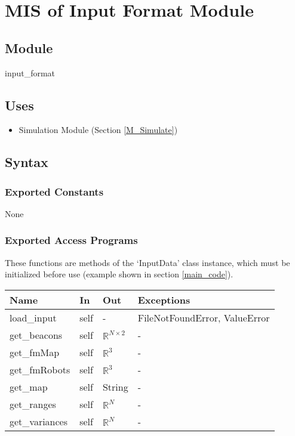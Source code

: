 \documentclass[12pt, titlepage]{article}
\begin{document}

\newpage

\section{MIS of Input Format Module} \label{M_Input} 



\subsection{Module}

input\_format

\subsection{Uses}
\begin{itemize}
  \item Simulation Module (Section \ref{M_Simulate})
\end{itemize}

\subsection{Syntax}

\subsubsection{Exported Constants}
None
\subsubsection{Exported Access Programs}

These functions are methods of the `InputData' class instance, which must be initialized before use (example shown in section \ref{main_code}).

\begin{center}
\begin{tabular}{p{3cm} p{2cm} p{2cm} p{4cm}}
\hline
\textbf{Name} & \textbf{In} & \textbf{Out} & \textbf{Exceptions} \\
\hline
load\_input & self & -& FileNotFoundError, ValueError \\
get\_beacons& self & $\mathbb{R}^{N \times 2}$ & - \\
get\_fmMap& self & $\mathbb{R}^3$ & - \\
get\_fmRobots& self & $\mathbb{R}^3$ & - \\
get\_map& self & String & - \\
get\_ranges& self & $\mathbb{R}^N$ & - \\
get\_variances& self & $\mathbb{R}^N$ & - \\
\hline
\end{tabular}
\end{center}
\end{document}
